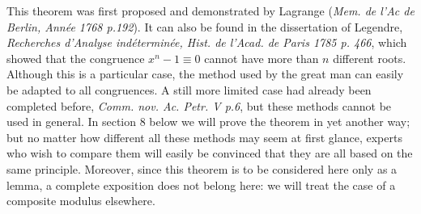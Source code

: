 \documentclass{book}
\theoremstyle{plain}
\theoremstyle{remark}
\begin{document}
This theorem was first proposed and demonstrated by Lagrange (\textit{Mem. de l'Ac de Berlin, Ann\'ee 1768 p.192}). It can also be found in the dissertation of Legendre, \textit{Recherches d'Analyse ind\'etermin\'ee, Hist. de l'Acad. de Paris 1785 p. 466}, which showed that the congruence $x^n-1\equiv0$ cannot have more than $n$ different roots. Although this is a particular case, the method used by the great man can easily be adapted to all congruences. A still more limited case had already been completed before, \textit{Comm. nov. Ac. Petr. V p.6}, but these methods cannot be used in general. In section 8 below we will prove the theorem in yet another way; but no matter how different all these methods may seem at first glance, experts who wish to compare them will easily be convinced that they are all based on the same principle. Moreover, since this theorem is to be considered here only as a lemma, a complete exposition does not belong here: we will treat the case of a composite modulus elsewhere.
\end{document}
